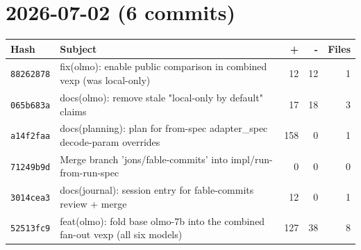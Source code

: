 \section*{2026-07-02 (6 commits)}
\begin{longtable}{@{}p{}p{}r r r@{}}
\toprule Hash & Subject & + & - & Files \\ \midrule\endhead
\texttt{88262878} & fix(olmo): enable public comparison in combined vexp (was local-only) & 12 & 12 & 1 \\
\texttt{065b683a} & docs(olmo): remove stale "local-only by default" claims & 17 & 18 & 3 \\
\texttt{a14f2faa} & docs(planning): plan for from-spec adapter\_spec decode-param overrides & 158 & 0 & 1 \\
\texttt{71249b9d} & Merge branch 'jons/fable-commits' into impl/run-from-run-spec & 0 & 0 & 0 \\
\texttt{3014cea3} & docs(journal): session entry for fable-commits review + merge & 12 & 0 & 1 \\
\texttt{52513fc9} & feat(olmo): fold base olmo-7b into the combined fan-out vexp (all six models) & 127 & 38 & 8 \\
\bottomrule\end{longtable}
